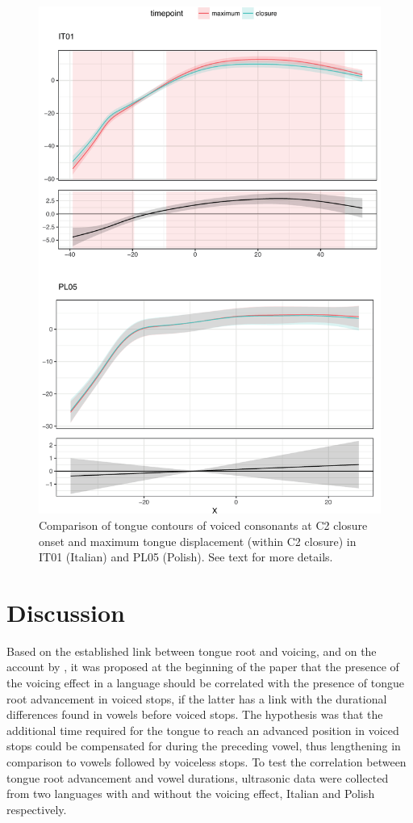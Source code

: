 \documentclass[authoryear, twocolumn]{elsarticle}
\begin{document}
\begin{figure}
    \centering
    \includegraphics[height=.9\textheight]{fig/voiced.pdf}
    \caption{Comparison of tongue contours of voiced consonants at C2 closure onset and maximum tongue displacement (within C2 closure) in IT01 (Italian) and PL05 (Polish). See text for more details.}
    \label{f:voiced}
\end{figure}

\section{Discussion}\label{discussion}

Based on the established link between tongue root and voicing, and on
the account by \citet{halle1967}, it was proposed at the beginning of
the paper that the presence of the voicing effect in a language should
be correlated with the presence of tongue root advancement in voiced
stops, if the latter has a link with the durational differences found in
vowels before voiced stops. The hypothesis was that the additional time
required for the tongue to reach an advanced position in voiced stops
could be compensated for during the preceding vowel, thus lengthening in
comparison to vowels followed by voiceless stops. To test the
correlation between tongue root advancement and vowel durations,
ultrasonic data were collected from two languages with and without the
voicing effect, Italian and Polish respectively.
\end{document}
